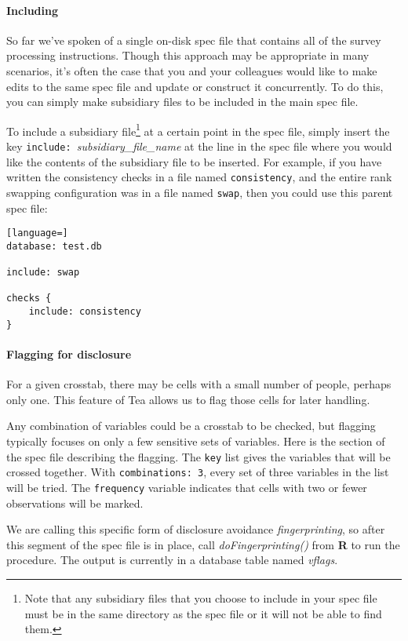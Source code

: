 \documentclass{article}
\begin{document}
\paragraph{Including} So far we've spoken of a single on-disk spec file that contains
all of the survey processing instructions.  Though this approach may be appropriate
in many scenarios, it's often the case that you and your colleagues would like to
make edits to the same spec file and update or construct it concurrently. To do this,
you can simply make subsidiary files to be included in the main spec file.

To include a subsidiary file\footnote{Note that any subsidiary files that you choose
to include in your spec file must be in the same directory as the spec file or it
will not be able to find them.} at a certain point in the spec file, simply insert
the key {\tt include: }\textit{subsidiary\_file\_name} at the line in the spec file
where you would like the contents of the subsidiary file to be inserted. For example,
if you have written the consistency checks in a file named {\tt consistency}, and the
entire rank swapping configuration was in a file named {\tt swap}, then you could use
this parent spec file:

\begin{lstlisting}[language=]
database: test.db

include: swap

checks {
    include: consistency
}
\end{lstlisting}

\paragraph{Flagging for disclosure} For a given crosstab, there may be cells with a
small number of people, perhaps only one. This feature of Tea allows us to flag those
cells for later handling.

Any combination of variables could be a crosstab to be checked, but flagging
typically focuses on only a few sensitive sets of variables. Here is the section
of the spec file describing the flagging. The {\tt key} list gives the variables
that will be crossed together. With {\tt combinations: 3}, every set of three
variables in the list will be tried. The {\tt frequency} variable indicates that
cells with two or fewer observations will be marked.

We are calling this specific form of disclosure avoidance {\em fingerprinting}, so after
this segment of the spec file is in place, call {\em doFingerprinting()} from \textbf{R} to run the
procedure. The output is currently in a database table named {\em vflags}.
\end{document}
